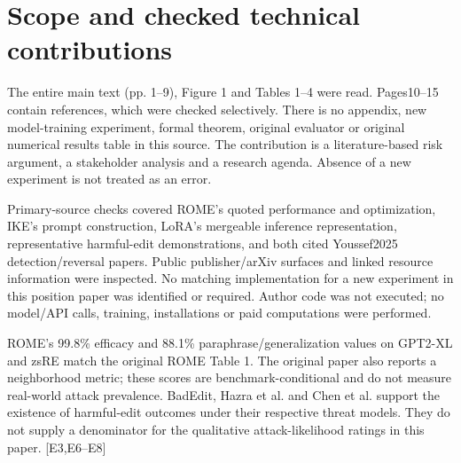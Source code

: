 \documentclass[10pt]{article}
\begin{document}
\section*{Scope and checked technical contributions}
The entire main text (pp. 1–9), Figure 1 and Tables 1–4 were read. Pages10–15 contain references, which were checked selectively. There is no appendix, new model-training experiment, formal theorem, original evaluator or original numerical results table in this source. The contribution is a literature-based risk argument, a stakeholder analysis and a research agenda. Absence of a new experiment is not treated as an error.\par
Primary-source checks covered ROME’s quoted performance and optimization, IKE’s prompt construction, LoRA’s mergeable inference representation, representative harmful-edit demonstrations, and both cited Youssef2025 detection/reversal papers. Public publisher/arXiv surfaces and linked resource information were inspected. No matching implementation for a new experiment in this position paper was identified or required. Author code was not executed; no model/API calls, training, installations or paid computations were performed.\par
ROME’s 99.8\% efficacy and 88.1\% paraphrase/generalization values on GPT2-XL and zsRE match the original ROME Table 1. The original paper also reports a neighborhood metric; these scores are benchmark-conditional and do not measure real-world attack prevalence. BadEdit, Hazra et al. and Chen et al. support the existence of harmful-edit outcomes under their respective threat models. They do not supply a denominator for the qualitative attack-likelihood ratings in this paper. [E3,E6–E8]\par
\end{document}

